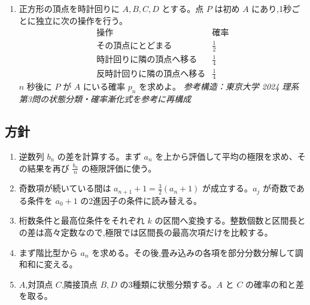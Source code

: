 \begin{enumerate}[label=\textbf{問\arabic*.},leftmargin=3.8em,format=\bookitemlink{practice-entrance}{problem}{answer}]
              によって定める。正整数 \(m\) に対して
          \[
            S_m=\sum_{k=1}^{m}a_k a_{m-k+1}
          \]
              とする。\(S_m\) を求めよ。
              \smallskip
              \textit{参考構造：大阪大学 2025 文系 第2問の畳み込み構造を参考に再構成}
        \item 正方形の頂点を時計回りに \(A,B,C,D\) とする。点 \(P\) は初め \(A\) にあり,1秒ごとに独立に次の操作を行う。
          \[
            \begin{array}{c|c}
              \text{操作} & \text{確率}\\ \hline
              \text{その頂点にとどまる} & \frac12\\
              \text{時計回りに隣の頂点へ移る} & \frac14\\
              \text{反時計回りに隣の頂点へ移る} & \frac14
            \end{array}
          \]
              \(n\) 秒後に \(P\) が \(A\) にいる確率 \(p_n\) を求めよ。
              \smallskip
              \textit{参考構造：東京大学 2024 理系 第3問の状態分類・確率漸化式を参考に再構成}
      \end{enumerate}

    \subsection{方針}\label{節：大学過去問ベースのもの：方針}
      \begin{enumerate}[label=\textbf{問\arabic*.},leftmargin=3.8em,format=\bookitemlink{practice-entrance}{hint}{problem}]
        \item 逆数列 \(b_n\) の差を計算する。まず \(a_n\) を上から評価して平均の極限を求め、その結果を再び \(\frac{b_n}{n}\) の極限評価に使う。
        \item 奇数項が続いている間は \(a_{n+1}+1=\frac32(a_n+1)\) が成立する。\(a_j\) が奇数である条件を \(a_0+1\) の2進因子の条件に読み替える。
        \item 桁数条件と最高位条件をそれぞれ \(k\) の区間へ変換する。整数個数と区間長との差は高々定数なので,極限では区間長の最高次項だけを比較する。
        \item まず階比型から \(a_n\) を求める。その後,畳み込みの各項を部分分数分解して調和和に変える。
        \item  \(A\),対頂点 \(C\),隣接頂点 \(B,D\) の3種類に状態分類する。\(A\) と \(C\) の確率の和と差を取る。
      \end{enumerate}

